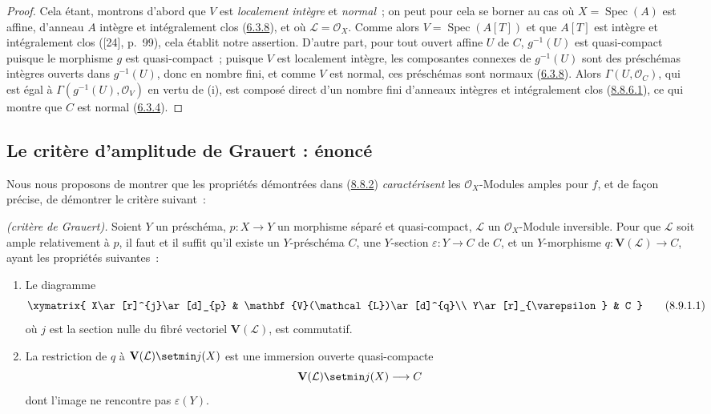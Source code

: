 \begin{proof}
Cela étant, montrons d'abord que $V$ est \emph{localement intègre} et \emph{normal}~;
on peut pour cela se borner au cas où $X=\operatorname{Spec}(A)$ est affine,
d'anneau $A$ intègre et intégralement clos
(\hyperref[II.6.3.8-fr]{6.3.8}), et où
$\mathcal{L}=\mathcal{O}_X$. Comme alors
$V=\operatorname{Spec}(A[T])$ et que $A[T]$ est intègre et intégralement clos
([24], p.~99), cela établit notre assertion. D'autre part, pour tout ouvert
affine $U$ de $C$, $g^{-1}(U)$ est quasi-compact puisque le morphisme $g$ est
quasi-compact~; puisque $V$ est localement intègre, les composantes connexes
de $g^{-1}(U)$ sont des préschémas intègres ouverts dans $g^{-1}(U)$, donc en
nombre fini, et comme $V$ est normal, ces préschémas sont normaux
(\hyperref[II.6.3.8-fr]{6.3.8}). Alors $\Gamma(U,\mathcal{O}_C)$, qui est égal
à $\Gamma(g^{-1}(U),\mathcal{O}_V)$ en vertu de (i), est composé direct d'un
nombre fini d'anneaux intègres et intégralement clos
(\hyperref[II.8.8.6.1-fr]{8.8.6.1}), ce qui montre que $C$ est normal
(\hyperref[II.6.3.4-fr]{6.3.4}).
\end{proof}

\subsection{Le critère d'amplitude de Grauert : énoncé}
\label{subsection:II.8.9-fr}

Nous nous proposons de montrer que les propriétés démontrées dans
(\hyperref[II.8.8.2-fr]{8.8.2}) \emph{caractérisent} les
$\mathcal{O}_X$-Modules amples pour $f$, et de façon précise, de démontrer le
critère suivant~:

\begin{theorem}[8.9.1]
\label{II.8.9.1-fr}
\emph{(critère de Grauert).} Soient $Y$ un préschéma,
$p:X\to Y$ un morphisme séparé et quasi-compact, $\mathcal{L}$ un
$\mathcal{O}_X$-Module inversible. Pour que $\mathcal{L}$ soit ample
relativement à $p$, il faut et il suffit qu'il existe un $Y$-préschéma $C$,
une $Y$-section $\varepsilon:Y\to C$ de $C$, et un $Y$-morphisme
$q:\mathbf{V}(\mathcal{L})\to C$, ayant les propriétés suivantes~:
\begin{enumerate}
  \item[\rm{(i)}] Le diagramme
  \begin{equation}
  \label{II.8.9.1.1-fr}
    \xymatrix{
      X\ar[r]^{j}\ar[d]_{p} & \mathbf{V}(\mathcal{L})\ar[d]^{q}\\
      Y\ar[r]_{\varepsilon} & C
    }
  \tag{8.9.1.1}
  \end{equation}
  où $j$ est la section nulle du fibré vectoriel $\mathbf{V}(\mathcal{L})$,
  est commutatif.
  \item[\rm{(ii)}] La restriction de $q$ à
  $\mathbf{V}(\mathcal{L})\setmin j(X)$ est une immersion ouverte quasi-compacte
  \[
    \mathbf{V}(\mathcal{L})\setmin j(X)\longrightarrow C
  \]
  dont l'image ne rencontre pas $\varepsilon(Y)$.
\end{enumerate}
\end{theorem}

